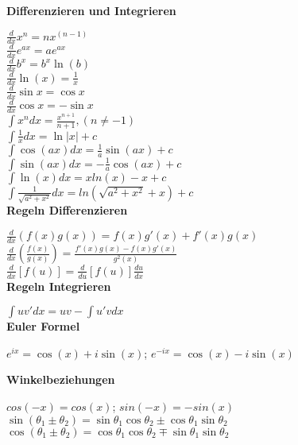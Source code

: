 \documentclass[10pt,twocolumn,a4paper]{article}
\begin{document}
\begin{flushleft}
\textbf{Differenzieren und Integrieren}

$\frac{d}{{dx}}x^n  = nx^{\left( {n - 1} \right)}$\\
$\frac{d}{{dx}}e^{ax}  = ae^{ax}$\\
$\frac{d}{{dx}}b^x  = b^x \ln \left( b \right)$\\
$\frac{d}{{dx}}\ln \left( x \right) = \frac{1}{x}$\\
$\frac{d}{{dx}}\sin x = \cos x$\\
$\frac{d}{{dx}}\cos x =  - \sin x$\\

$\int {x^n } dx = \frac{{x^{n + 1} }}{{n + 1}},(n \ne  - 1)$\\
$\int {\frac{1}{x}} dx = \ln \left| x \right| + c$\\
$\int {\cos (ax)} dx = \frac{1}{a}\sin (ax) + c$\\
$\int {\sin (ax)} dx =  - \frac{1}{a}\cos (ax) + c$\\
$\int {\ln (x)} dx = x ln(x) -x + c$\\
$\int \frac{1}{\sqrt{a^2+x^2}} dx = ln(\sqrt{a^2+x^2}+x) + c$\\

\textbf{Regeln Differenzieren}

$\frac{d}{{dx}}\left( {f\left( x \right)g\left( x \right)} \right) = f\left( x \right)g'\left( x \right) + f'\left( x \right)g\left( x \right)$\\
$\frac{d}{{dx}}\left( {\frac{{f\left( x \right)}}{{g\left( x \right)}}} \right) = \frac{{f'\left( x \right)g\left( x \right) - f\left( x \right)g'\left( x \right)}}{{g^2 \left( x \right)}}$\\
$\frac{d}{{dx}}\left[ {f\left( u \right)} \right] = \frac{d}{{du}}\left[ {f\left( u \right)} \right]\frac{{du}}{{dx}}$\\

\textbf{Regeln Integrieren}

$\int {uv'} dx = uv - \int {u'v}dx$\\

\textbf{Euler Formel}

$e^{ix} = \cos(x) + i \sin(x)$;
$e^{-ix} = \cos(x) - i \sin(x)$

\textbf{Winkelbeziehungen}

$cos(-x) = cos(x)$; $sin(-x) = -sin(x)$\\
$\sin \left( {\theta _1  \pm \theta _2 } \right) = \sin \theta _1 \cos \theta _2  \pm \cos \theta _1 \sin \theta _2$\\
$\cos \left( {\theta _1  \pm \theta _2 } \right) = \cos \theta _1 \cos \theta _2  \mp \sin \theta _1 \sin \theta _2$\\


\end{flushleft}
\end{document}
